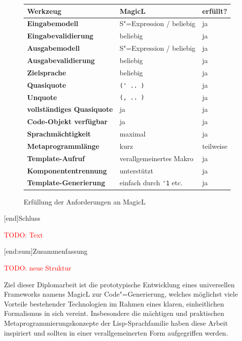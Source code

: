 \documentclass[11pt, a4paper, bibgerm]{scrbook}
\newcommand\icode[1]{\lstinline?#1?}
\newcommand{\todo}[1]{
  \textcolor{red}{TODO: #1}
}
\newcommand\lchapter{}
\newcommand\lsection{}
\newcommand{\sexp}{S"=Expression}
\newcommand{\cgen}{Code"=Generierung}
\begin{document}
\begin{figure}[h]
\begin{tabular}{|l|l|l|} \hline
\bf Werkzeug                 & \bf MagicL                    & \bf erfüllt?  \\\hline\hline    
\bf Eingabemodell            & \sexp{} / beliebig            &     ja        \\\hline           
\bf Eingabevalidierung       & beliebig                      &     ja        \\\hline      
\bf Ausgabemodell            & \sexp{} / beliebig            &     ja        \\\hline      
\bf Ausgabevalidierung       & beliebig                      &     ja        \\\hline      
\bf Zielsprache              & beliebig                      &     ja        \\\hline      
\bf Quasiquote               & \icode{(' .. )}               &     ja        \\\hline   
\bf Unquote                  & \icode{(, .. )}               &     ja        \\\hline
\bf vollständiges Quasiquote & ja                            &     ja        \\\hline      
\bf Code-Objekt verfügbar    & ja                            &     ja        \\\hline      
\bf Sprachmächtigkeit        & maximal                       &     ja        \\\hline      
\bf Metaprogrammlänge        & kurz                          & teilweise     \\\hline
\bf Template-Aufruf          & verallgemeinertes Makro       &     ja        \\\hline      
\bf Komponententrennung      & unterstützt                   &     ja        \\\hline      
\bf Template-Generierung     & einfach durch \icode{'1} etc. &     ja        \\\hline      
\end{tabular}
\caption{Erfüllung der Anforderungen an MagicL}
\label{magicl:fig:disc_reqs}
\end{figure}

\lchapter[end]{Schluss}

\todo{Text}

\lsection[end:sum]{Zusammenfassung}

\todo{neue Struktur}

Ziel dieser Diplomarbeit ist die prototypische Entwicklung eines
universellen Frameworks namens MagicL zur \cgen{}, welches möglichst
viele Vorteile bestehender Technologien im Rahmen eines klaren,
einheitlichen Formalismus in sich vereint. Insbesondere die mächtigen
und praktischen Metaprogrammierungskonzepte der Lisp-Sprachfamilie haben
diese Arbeit inspiriert und sollten in einer verallgemeinerten Form
aufgegriffen werden.
\end{document}
